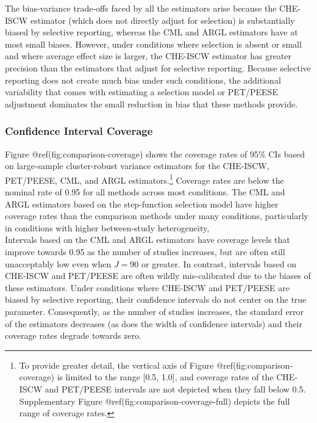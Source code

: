 \documentclass[
]{article}
\begin{document}
The bias-variance trade-offs faced by all the estimators arise because
the CHE-ISCW estimator (which does not directly adjust for selection) is
substantially biased by selective reporting, whereas the CML and ARGL
estimators have at most small biases. However, under conditions where
selection is absent or small and where average effect size is larger,
the CHE-ISCW estimator has greater precision than the estimators that
adjust for selective reporting. Because selective reporting does not
create much bias under such conditions, the additional variability that
comes with estimating a selection model or PET/PEESE adjustment
dominates the small reduction in bias that these methods provide.

\subsubsection{Confidence Interval
Coverage}\label{confidence-interval-coverage}

Figure @ref(fig:comparison-coverage) shows the coverage rates of 95\%
CIs based on large-sample cluster-robust variance estimators for the
CHE-ISCW, PET/PEESE, CML, and ARGL estimators.\footnote{To provide
  greater detail, the vertical axis of Figure
  @ref(fig:comparison-coverage) is limited to the range {[}0.5, 1.0{]},
  and coverage rates of the CHE-ISCW and PET/PEESE intervals are not
  depicted when they fall below 0.5. Supplementary Figure
  @ref(fig:comparison-coverage-full) depicts the full range of coverage
  rates.} Coverage rates are below the nominal rate of 0.95 for all
methods across most conditions. The CML and ARGL estimators based on the
step-function selection model have higher coverage rates than the
comparison methods under many conditions, particularly in conditions
with higher between-study heterogeneity,\\
Intervals based on the CML and ARGL estimators have coverage levels that
improve towards 0.95 as the number of studies increases, but are often
still unacceptably low even when \(J = 90\) or greater. In contrast,
intervals based on CHE-ISCW and PET/PEESE are often wildly
mis-calibrated due to the biases of these estimators. Under conditions
where CHE-ISCW and PET/PEESE are biased by selective reporting, their
confidence intervals do not center on the true parameter. Consequently,
as the number of studies increases, the standard error of the estimators
decreases (as does the width of confidence intervals) and their coverage
rates degrade towards zero.
\end{document}
